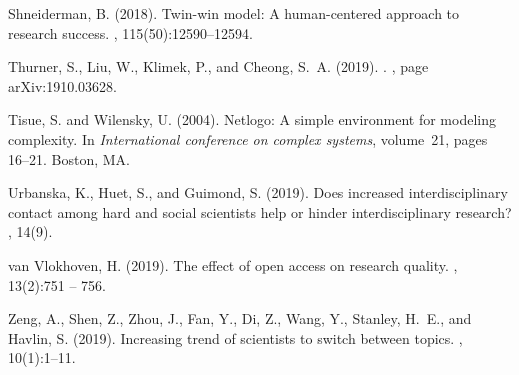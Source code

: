 \documentclass[utf8,11pt]{article}
\begin{document}
\begin{thebibliography}{}
Shneiderman, B. (2018).
\newblock Twin-win model: A human-centered approach to research success.
,
  115(50):12590--12594.

{Thurner}, S., {Liu}, W., {Klimek}, P., and {Cheong}, S.~A. (2019).
.
, page arXiv:1910.03628.

Tisue, S. and Wilensky, U. (2004).
\newblock Netlogo: A simple environment for modeling complexity.
\newblock In {\em International conference on complex systems}, volume~21,
  pages 16--21. Boston, MA.

Urbanska, K., Huet, S., and Guimond, S. (2019).
\newblock Does increased interdisciplinary contact among hard and social
  scientists help or hinder interdisciplinary research?
, 14(9).

van Vlokhoven, H. (2019).
\newblock The effect of open access on research quality.
, 13(2):751 -- 756.

Zeng, A., Shen, Z., Zhou, J., Fan, Y., Di, Z., Wang, Y., Stanley, H.~E., and
  Havlin, S. (2019).
\newblock Increasing trend of scientists to switch between topics.
, 10(1):1--11.

\end{thebibliography}






\end{document}
